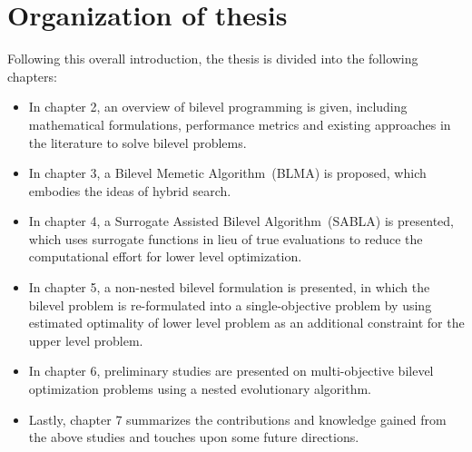 \section{Organization of thesis}

Following this overall introduction, the thesis is divided into the following chapters:

\begin{itemize}
\item In chapter 2, an overview of bilevel programming is given, including mathematical formulations, performance metrics and existing approaches in the literature to solve bilevel problems.

\item In chapter 3, a Bilevel Memetic Algorithm~(BLMA) is proposed, which embodies the ideas of hybrid search. 

\item In chapter 4, a Surrogate Assisted Bilevel Algorithm~(SABLA) is presented, which uses surrogate functions in lieu of true evaluations to reduce the computational effort for lower level optimization.

\item In chapter 5, a non-nested bilevel formulation is presented, in which the bilevel problem is re-formulated into a single-objective problem by using estimated optimality of lower level problem as an additional constraint for the upper level problem. 

\item In chapter 6, preliminary studies are presented on multi-objective bilevel optimization problems using a nested evolutionary algorithm. 

\item Lastly, chapter 7 summarizes the contributions and knowledge gained from the above studies and touches upon some future directions. 
\end{itemize}

